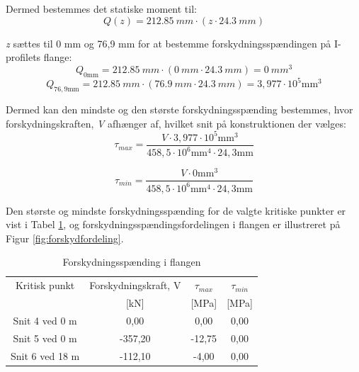 Dermed bestemmes det statiske moment til:
\begin{equation}
Q(z) = \SI{212,85}{mm} \cdot (z \cdot \SI{24,3}{mm})
\end{equation}

\textit{z} sættes til 0 mm og 76,9 mm for at bestemme forskydningsspændingen på I-profilets flange:
\begin{equation}
Q_{0 \text{mm}} = \SI{212,85}{mm} \cdot (\SI{0}{mm} \cdot \SI{24,3}{mm}) = \SI{0}{mm^3}
\end{equation} 
\begin{equation}
	Q_{76,9 \text{mm}} = \SI{212,85}{mm} \cdot (\SI{76,9}{mm} \cdot \SI{24,3}{mm}) =  3,\!977 \cdot 10^5 \text{mm}^3 
\end{equation}

Dermed kan den mindste og den største forskydningsspænding bestemmes, hvor forskydningskraften, \textit{V} afhænger af, hvilket snit på konstruktionen der vælges:
\begin{equation}
	\tau_{max} = \frac{V \cdot 3,977 \cdot 10^5 \text{mm}^3}{458,\!5 \cdot 10^6 \text{mm}^4 \cdot 24,\!3 \text{mm}}
\end{equation}

\begin{equation}
	\tau_{min} = \frac{V \cdot 0 \text{mm}^3}{458,\!5 \cdot 10^6 \text{mm}^4 \cdot 24,\!3 \text{mm}}
\end{equation}

Den største og mindste forskydningsspænding for de valgte kritiske punkter er vist i Tabel \ref{tab:forskudning}, og forskydningsspændingsfordelingen i flangen er illustreret på Figur \ref{fig:forskydfordeling}.

\begin{table} [H]
	\begin{center}
		\begin{tabular}{c c c c }
			\hline
			Kritisk punkt   & Forskydningskraft, V & $\tau_{max}$ & $\tau_{min}$ \\ 
			& [kN] & [MPa] & [MPa]
			\\ \hline
			Snit 4 ved 0 m  & 0,00                       & 0,00              & 0,00                     \\ \hline
			Snit 5 ved 0 m  & -357,20                 & -12,75         & 0,00                     \\ \hline
			Snit 6 ved 18 m & -112,10                 & -4,00          & 0,00                     \\ \hline
		\end{tabular}
		\caption{Forskydningsspænding i flangen}
		\label{tab:forskudning}
	\end{center}
\end{table}

